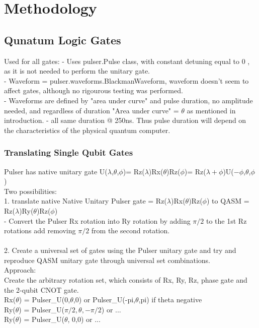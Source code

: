 \section{Methodology}
\label{sec:methods}

\subsection{Qunatum Logic Gates}
\label{sec:Gates}
Used for all gates:
- Uses pulser.Pulse class, with constant detuning equal to 0 , as it is not needed to perform the unitary gate.\\
- Waveform = pulser.waveforms.BlackmanWaveform, waveform doesn't seem to affect gates, although no rigourous testing was performed.\\
- Waveforms are defined by "area under curve" and pulse duration, no amplitude needed, and regardless of duration "Area under curve" = $\theta$
 as mentioned in introduction.
- all same duration @ 250ns. Thus pulse duration will depend on the characteristics of the physical quantum computer.

\subsubsection{Translating Single Qubit Gates}
\label{sec:SingleGatesTranslating}

Pulser has native unitary gate U($\lambda$,$\theta$,$\phi$)= Rz($\lambda$)Rx($\theta$)Rz($\phi$)= Rz($\lambda+\phi$)U($-\phi$,$\theta$,$\phi$)\\

Two possibilities:\\
1. translate native Native Unitary Pulser gate = Rz($\lambda$)Rx($\theta$)Rz($\phi$) to QASM = Rz($\lambda$)Ry($\theta$)Rz($\phi$)\\
    -   Convert the Pulser Rx rotation into Ry rotation by adding $\pi/2$ to the 1st Rz rotations add removing $\pi/2$ from the second rotation.\\\\

2. Create a universal set of gates using the Pulser unitary gate and try and reproduce QASM unitary gate through universal set combinations.\\
Approach:\\
    Create the arbitrary rotation set, which consists of Rx, Ry, Rz, phase gate and the 2-qubit CNOT gate.\\
    Rx($\theta$) = Pulser\_U(0,$\theta$,0) or Pulser\_U(-pi,$\theta$,pi) if theta negative\\
    Ry($\theta$) = Pulser\_U($\pi/2,\theta, -\pi/2$) or ... \\
    Ry($\theta$) = Pulser\_U($\theta$, 0,0) or ... \\
    
